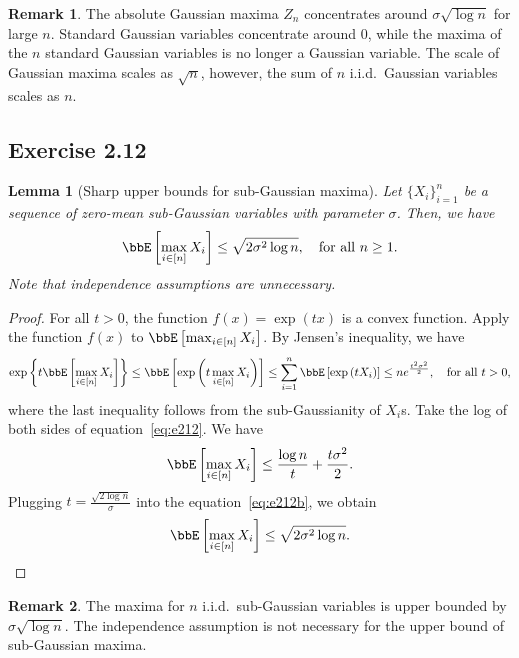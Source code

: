 \documentclass[11pt]{article}
\newcommand{\of}[1]{\left(#1\right)}
\newcommand{\off}[1]{\left[#1\right]}
\newcommand{\offf}[1]{\left\{#1\right\}}
\theoremstyle{plain}
\newtheorem{lem}{Lemma}
\theoremstyle{definition}
\newtheorem{rmk}{Remark}
\begin{document}
\begin{rmk}
	The absolute Gaussian maxima $Z_n$ concentrates around $\sigma \sqrt{\log n}$ for large $n$. Standard Gaussian variables concentrate around 0, while the maxima of the $n$ standard Gaussian variables is no longer a Gaussian variable. The scale of Gaussian maxima scales as $\sqrt{n}$, however, the sum of $n$ i.i.d.\ Gaussian variables scales as $n$.
\end{rmk}

\subsection{Exercise 2.12}\label{ex:12}
\begin{lem}[Sharp upper bounds for sub-Gaussian maxima]
	Let $\{X_i\}_{i = 1}^n$ be a sequence of zero-mean sub-Gaussian variables with parameter $\sigma$. Then, we have
	\begin{equation}
		\bbE \off{\max_{i \in [n]} X_i} \leq \sqrt{2\sigma^2 \log n}, \quad \text{for all } n \geq 1.
	\end{equation}
	Note that independence assumptions are unnecessary.
\end{lem}

\begin{proof}
	For all $t >0$, the function $f(x) = \exp \of{tx}$ is a convex function. Apply the function $f(x)$ to $\bbE \off{\max_{i \in [n]} X_i} $. By Jensen's inequality, we have
	\begin{equation}\label{eq:e212}
		\exp \offf{t \bbE \off{\max_{i \in [n]} X_i} } \leq \bbE\off{\exp \of{t \max_{i \in [n]} X_i }} \leq \sum_{i= 1}^n \bbE\off{\exp \of{t X_i }} \leq n e^{\frac{t^2 \sigma^2}{2}}, \quad \text{for all }t > 0,
	\end{equation}
	where the last inequality follows from the sub-Gaussianity of $X_i$s. Take the log of both sides of equation~\eqref{eq:e212}. We have
	\begin{equation}\label{eq:e212b}
		\bbE \off{\max_{i \in [n]} X_i}  \leq \frac{\log n}{t} + \frac{t\sigma^2}{2}.
	\end{equation}
	Plugging $t = \frac{\sqrt{2\log n} }{\sigma}$ into the equation~\eqref{eq:e212b}, we obtain
	\[ \bbE \off{\max_{i \in [n]} X_i}  \leq \sqrt{2 \sigma^2 \log n}.\]
\end{proof}

\begin{rmk}
	The maxima for $n$ i.i.d.\ sub-Gaussian variables is upper bounded by $\sigma \sqrt{\log n}$. The independence assumption is not necessary for the upper bound of sub-Gaussian maxima.
\end{rmk}
\end{document}
